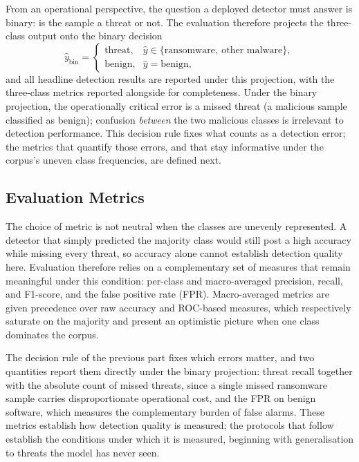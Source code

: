 \documentclass[%
    BCOR=10mm,
    DIV=13,
    toc=bibliography,
    toc=listof,
    oneside,
    12pt,
]{scrbook}
\begin{document}
From an operational perspective, the question a deployed detector must answer
is binary: is the sample a threat or not. The evaluation therefore projects
the three-class output onto the binary decision
\begin{equation}
\hat{y}_{\mathrm{bin}} =
\begin{cases}
\text{threat}, & \hat{y} \in \{\text{ransomware},\ \text{other malware}\},\\[2pt]
\text{benign}, & \hat{y} = \text{benign},
\end{cases}
\label{eq:binary_projection}
\end{equation}
and all headline detection results are reported under this projection, with
the three-class metrics reported alongside for completeness. Under the binary
projection, the operationally critical error is a missed threat (a malicious
sample classified as benign); confusion \emph{between} the two malicious
classes is irrelevant to detection performance. This decision rule fixes what
counts as a detection error; the metrics that quantify those errors, and that
stay informative under the corpus's uneven class frequencies, are defined next.

\subsection{Evaluation Metrics}
\label{subsec:metrics}

The choice of metric is not neutral when the classes are unevenly represented. A
detector that simply predicted the majority class would still post a high
accuracy while missing every threat, so accuracy alone cannot establish
detection quality here. Evaluation therefore relies on a complementary set of
measures that remain meaningful under this condition: per-class and
macro-averaged precision, recall, and F1-score, and the false positive rate
(FPR). Macro-averaged metrics are given precedence over raw accuracy and
ROC-based measures, which respectively saturate on the majority and present an
optimistic picture when one class dominates the corpus.

The decision rule of the previous part fixes which errors matter, and two
quantities report them directly under the binary projection: threat recall
together with the absolute count of missed threats, since a single missed
ransomware sample carries disproportionate operational cost, and the FPR on
benign software, which measures the complementary burden of false alarms. These
metrics establish how detection quality is measured; the protocols that follow
establish the conditions under which it is measured, beginning with
generalisation to threats the model has never seen.
\end{document}
